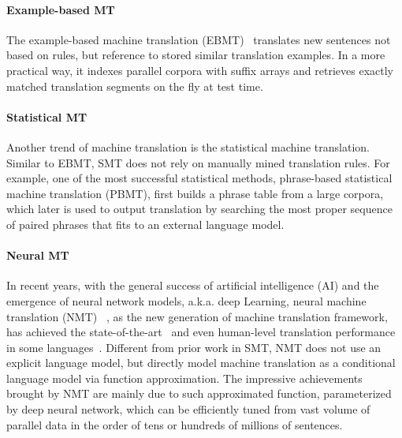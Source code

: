 \paragraph{Example-based MT}
The example-based machine translation (EBMT)~\citep{Zhang2005AnEP,callison2005scaling,phillips2012modeling} translates new sentences not based on rules, but reference to stored similar translation examples. In a more practical way, it indexes parallel corpora with suffix arrays and retrieves exactly matched translation segments on the fly at test time. %


\paragraph{Statistical MT} Another trend of machine translation is the statistical machine translation. Similar to EBMT, SMT does not rely on manually mined translation rules. For example, one of the most successful statistical methods,  phrase-based statistical machine translation (PBMT), first builds a phrase table from a large corpora, which later is used to output translation by searching the most proper sequence of paired phrases that fits to an external language model.

\paragraph{Neural MT}
In recent years, with the general success of artificial intelligence (AI) and the emergence of neural network models, a.k.a. deep Learning, neural machine translation (NMT)~\cite{sutskever2014sequence,bahdanau2014neural,vaswani2017attention} , as the new generation of machine translation framework, has achieved the state-of-the-art~\cite{wu2016google} and even human-level translation performance in some languages~\cite{hassan-hp}.
Different from prior work in SMT, NMT does not use an explicit language model, but directly model machine translation as a conditional language model via function approximation.  
The impressive achievements brought by NMT are mainly due to such approximated function, parameterized by deep neural network, 
which can be efficiently tuned from vast volume of parallel data in the order of tens or hundreds of millions of sentences. 

